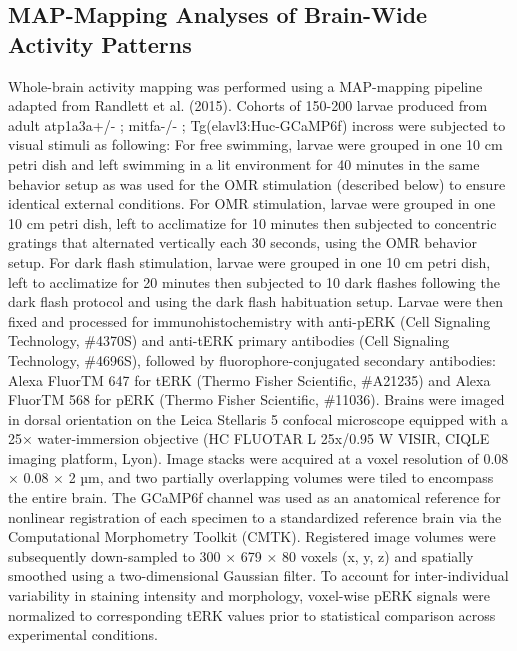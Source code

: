 \documentclass[9.5pt,lineno]{RandlettLab_elife}
\begin{document}
\subsection{MAP-Mapping Analyses of Brain-Wide Activity Patterns}
Whole-brain activity mapping was performed using a MAP-mapping pipeline adapted from Randlett et al. (2015).
Cohorts of 150-200 larvae produced from adult atp1a3a+/- ; mitfa-/- ; Tg(elavl3:Huc-GCaMP6f) incross were subjected to visual stimuli as following:
For free swimming, larvae were grouped in one 10 cm petri dish and left swimming in a lit environment for 40 minutes in the same behavior setup as was used for the OMR stimulation (described below) to ensure identical external conditions.
For OMR stimulation, larvae were grouped in one 10 cm petri dish, left to acclimatize for 10 minutes then subjected to concentric gratings that alternated vertically each 30 seconds, using the OMR behavior setup.
For dark flash stimulation, larvae were grouped in one 10 cm petri dish, left to acclimatize for 20 minutes then subjected to 10 dark flashes following the dark flash protocol and using the dark flash habituation setup.
Larvae were then fixed and processed for immunohistochemistry with anti-pERK (Cell Signaling Technology, \#4370S) and anti-tERK primary antibodies (Cell Signaling Technology, \#4696S), followed by fluorophore-conjugated secondary antibodies: Alexa FluorTM 647 for tERK (Thermo Fisher Scientific, \#A21235) and Alexa FluorTM 568 for pERK (Thermo Fisher Scientific, \#11036).
Brains were imaged in dorsal orientation on the Leica Stellaris 5 confocal microscope equipped with a 25× water-immersion objective (HC FLUOTAR L 25x/0.95 W VISIR, CIQLE imaging platform, Lyon).
Image stacks were acquired at a voxel resolution of 0.08 × 0.08 × 2 µm, and two partially overlapping volumes were tiled to encompass the entire brain.
The GCaMP6f channel was used as an anatomical reference for nonlinear registration of each specimen to a standardized reference brain via the Computational Morphometry Toolkit (CMTK).
Registered image volumes were subsequently down-sampled to 300 × 679 × 80 voxels (x, y, z) and spatially smoothed using a two-dimensional Gaussian filter.
To account for inter-individual variability in staining intensity and morphology, voxel-wise pERK signals were normalized to corresponding tERK values prior to statistical comparison across experimental conditions.
\end{document}
